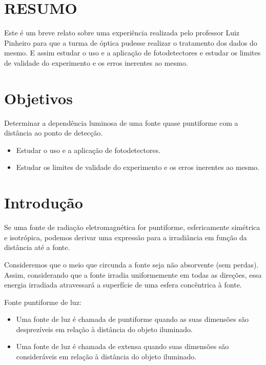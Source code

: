\documentclass [a4paper, 12pt]{article}
\title{\sc{\textbf{Irradiância de uma fonte quase puntiforme}}}
\author{\textit{João Pedro Silva dos Santos}}
\date{\empty}
\begin{document}
\maketitle

\section*{\hfill{RESUMO}}

Este é um breve relato sobre uma experiência realizada pelo professor Luiz Pinheiro para que a turma de óptica pudesse realizar o tratamento dos dados do mesmo. E assim estudar o uso e a aplicação de fotodetectores e estudar os limites de validade do experimento e os erros inerentes ao mesmo.


\section{Objetivos}

Determinar a dependência luminosa de uma fonte quase puntiforme com a distância ao ponto de detecção.

\begin{itemize}
    \item Estudar o uso e a aplicação de fotodetectores.
    \item Estudar os limites de validade do experimento e os erros inerentes ao mesmo.
\end{itemize}

\section{Introdução}

Se uma fonte de radiação eletromagnética for puntiforme,
esfericamente simétrica e isotrópica, podemos derivar uma expressão
para a irradiância em função da distância até a fonte.

Consideremos que o meio que
circunda a fonte seja não absorvente (sem
perdas). Assim, considerando que a fonte
irradia uniformemente em todas as
direções, essa energia irradiada
atravessará a superfície de uma esfera
concêntrica à fonte.

Fonte puntiforme de luz:

\begin{itemize}
    \item Uma fonte de luz é chamada de puntiforme quando as suas dimensões são desprezíveis em relação à distância do objeto iluminado.
    
    \item Uma fonte de luz é chamada de extensa quando suas dimensões são consideráveis em relação à distância do objeto iluminado.

\end{itemize}
\end{document}
